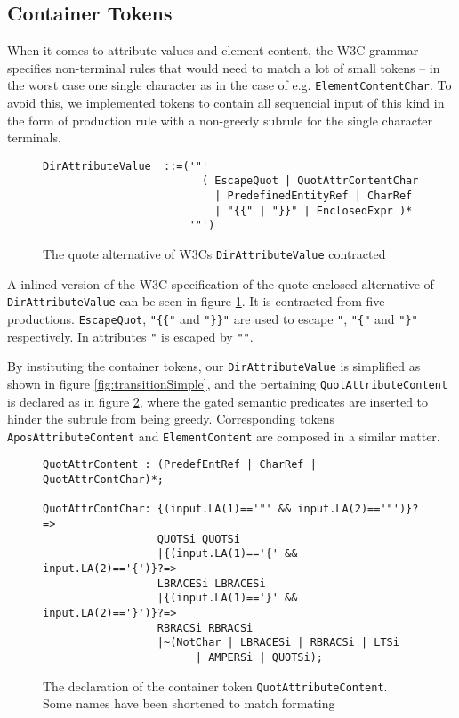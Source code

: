 \subsection{Container Tokens}
\label{sect:rewriteGrammar:containerTokens}
When it comes to attribute values and element content, the W3C grammar
specifies non-terminal rules that would need to match a lot of small tokens -- in the worst case one single character as in the case of e.g. \verb!ElementContentChar!. To avoid this, we implemented tokens to contain all sequencial input of this kind in the form of production rule with a non-greedy subrule for the single character terminals. 

\begin{figure}[h!]
\begin{Verbatim}
DirAttributeValue  ::=('"' 
                         ( EscapeQuot | QuotAttrContentChar
                           | PredefinedEntityRef | CharRef 
                           | "{{" | "}}" | EnclosedExpr )* 
                       '"')
\end{Verbatim}
\caption[W3Cs \texttt{DirAttributeValue} contracted]{The quote alternative of W3Cs \texttt{DirAttributeValue} contracted}
\label{fig:contractAttribute}
\end{figure}

A inlined version of the W3C specification of the quote enclosed alternative of \verb!DirAttributeValue! can be seen in figure \ref{fig:contractAttribute}. It is contracted from five productions. \verb!EscapeQuot!, \verb!"{{"! and \verb!"}}"! are used to escape \verb!"!, \verb!"{"! and \verb!"}"! respectively. In attributes \verb!"! is escaped by \verb!""!. 

By instituting the container tokens, our \verb!DirAttributeValue! is simplified as shown in figure \ref{fig:transitionSimple}, and the pertaining \verb!QuotAttributeContent! is declared as in figure \ref{fig:containerToken}, where the gated semantic predicates are inserted to hinder the subrule from being greedy. Corresponding tokens \verb!AposAttributeContent! and \verb!ElementContent! are composed in a similar matter.

\begin{figure}[h!]
\begin{Verbatim}
QuotAttrContent : (PredefEntRef | CharRef | QuotAttrContChar)*;

QuotAttrContChar: {(input.LA(1)=='"' && input.LA(2)=='"')}?=> 
                  QUOTSi QUOTSi
                  |{(input.LA(1)=='{' && input.LA(2)=='{')}?=> 
                  LBRACESi LBRACESi 
                  |{(input.LA(1)=='}' && input.LA(2)=='}')}?=> 
                  RBRACSi RBRACSi 
                  |~(NotChar | LBRACESi | RBRACSi | LTSi 
                        | AMPERSi | QUOTSi);
\end{Verbatim}
\caption[Example of container token]{The declaration of the container token \texttt{QuotAttributeContent}. Some names have been shortened to match formating}
\label{fig:containerToken}
\end{figure}